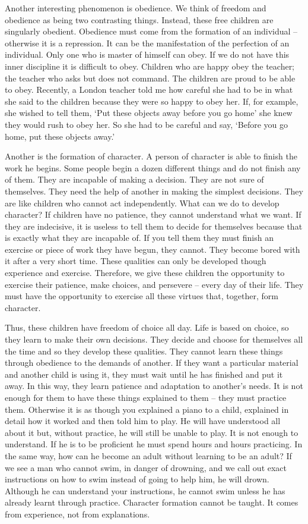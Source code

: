 \documentclass[lang=cn,10pt]{elegantbook}
\begin{document}
Another interesting phenomenon is obedience. We think of freedom and obedience as being two contrasting things. Instead, these free children are singularly obedient. Obedience must come from the formation of an individual – otherwise it is a repression. It can be the manifestation of the perfection of an individual. Only one who is master of himself can obey. If we do not have this inner discipline it is difficult to obey. Children who are happy obey the teacher; the teacher who asks but does not command. The children are proud to be able to obey. Recently, a London teacher told me how careful she had to be in what she said to the children because they were so happy to obey her. If, for example, she wished to tell
them, ‘Put these objects away before you go home’ she knew they would rush to obey her. So she had to be careful and say, ‘Before you go home, put these objects away.’

Another is the formation of character. A person of character is able to finish the work he begins. Some people begin a dozen different things and do not finish any of them. They are incapable of making a decision. They are not sure of themselves. They need the help of another in making the simplest decisions. They are like children who cannot act independently. What can we do to develop character? If children have no patience, they cannot understand what we want. If they are indecisive, it is useless to tell them to decide for themselves because that is exactly what they are incapable of. If you tell them they must finish an exercise or piece of work they have begun, they cannot. They become bored with it after
a very short time. These qualities can only be developed though experience and exercise. Therefore, we give these children the opportunity to exercise their patience, make choices, and persevere – every day of their life. They must have the opportunity to exercise all these virtues that, together, form character.

Thus, these children have freedom of choice all day. Life is based on choice, so they learn to make their own decisions. They decide and choose for themselves all the time and so they develop these qualities. They cannot learn these things through obedience to the demands of another. If they want a particular material and another child is using it, they must wait until he has finished and put it away. In this way, they learn patience and adaptation to another’s needs. It is not enough for them to have these things explained to them – they must practice them. Otherwise it is as though you explained a piano to a child, explained in detail how it worked and then told him to play. He will have understood all about it but, without practice, he will still be unable to play. It is not enough to understand. If he is to be proficient he must spend hours and hours practicing. In the same way, how can he become an adult without learning to be an adult? If we see a man who cannot swim, in danger of drowning, and we call out exact instructions on how to swim instead of going to
help him, he will drown. Although he can understand your instructions, he cannot swim unless he has already learnt through practice. Character formation cannot be taught. It comes from experience, not from explanations.
\end{document}
